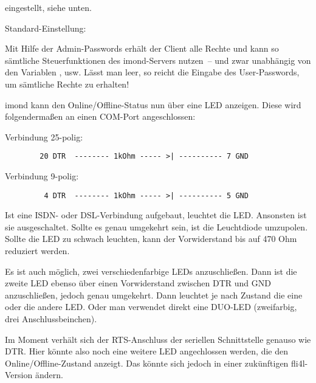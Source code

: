 \begin{description}
{      eingestellt, siehe unten.
      }



    Standard-Einstellung: 
    
    { Mit Hilfe der Admin-Passwords erhält der Client alle Rechte und
      kann so sämtliche Steuerfunktionen des imond-Servers nutzen~-- und
      zwar unabhängig von den Variablen ,  usw.
      Lässt man  leer, so reicht die Eingabe des
      User-Passwords, um sämtliche Rechte zu erhalten!
    }



    {imond kann den Online/Offline-Status nun über eine LED anzeigen.
      Diese wird folgendermaßen an einen COM-Port angeschlossen:

      Verbindung 25-polig:

\begin{example}
\begin{verbatim}
        20 DTR  -------- 1kOhm ----- >| ---------- 7 GND
\end{verbatim}
\end{example}


      Verbindung  9-polig:
\begin{example}
\begin{verbatim}
         4 DTR  -------- 1kOhm ----- >| ---------- 5 GND
\end{verbatim}
\end{example}

      Ist eine ISDN- oder DSL-Verbindung aufgebaut, leuchtet die LED.
      Ansonsten ist sie ausgeschaltet. Sollte es genau umgekehrt sein,
      ist die Leuchtdiode umzupolen. Sollte die LED zu schwach
      leuchten, kann der Vorwiderstand bis auf 470 Ohm reduziert
      werden.

      Es ist auch möglich, zwei verschiedenfarbige LEDs anzuschließen.
      Dann ist die zweite LED ebenso über einen Vorwiderstand zwischen
      DTR und GND anzuschließen, jedoch genau umgekehrt. Dann leuchtet
      je nach Zustand die eine oder die andere LED. Oder man verwendet
      direkt eine DUO-LED (zweifarbig, drei Anschlussbeinchen).

      Im Moment verhält sich der RTS-Anschluss der seriellen
      Schnittstelle genauso wie DTR. Hier könnte also noch eine
      weitere LED angechlossen werden, die den Online/Offline-Zustand
      anzeigt. Das könnte sich jedoch in einer zukünftigen
      fli4l-Version ändern.

}
\end{description}
